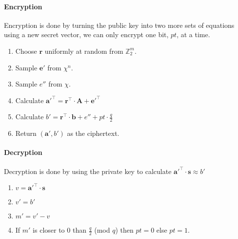 \documentclass[a4paper, 11pt, openany]{book}
\numberwithin{equation}{section}
\theoremstyle{plain}
\theoremstyle{definition}
\begin{document}
\paragraph{Encryption} Encryption is done by turning the public key into two more sets of equations using a new secret vector, we can only encrypt one bit, $pt$, at a time.
\begin{enumerate}
	\item Choose $\textbf{r}$ uniformly at random from $\mathbb{Z}^{m}_{2}$.
	\item Sample $\textbf{e}'$ from $\chi^{n}$.
	\item Sample $e''$ from $\chi$.
	\item Calculate $\textbf{a}'^{\top} = \textbf{r}^{\top}\cdot\textbf{A} + \textbf{e}'^{\top}$
	\item Calculate $b' = \textbf{r}^{\top}\cdot\textbf{b} + e'' + pt\cdot\frac{q}{2}$ 
	\item Return $(\textbf{a}',b')$ as the ciphertext.
\end{enumerate}
\paragraph{Decryption} Decryption is done by using the private key to calculate $\textbf{a}'^{\top}\cdot\textbf{s} \approx b'$
\begin{enumerate}
	\item $v = \textbf{a}'^{\top}\cdot\textbf{s}$
	\item $v' = b'$
	\item $m' = v' - v$
	\item If $m'$ is closer to 0 than $\frac{q}{2}$ (mod $q$) then $pt = 0$ else $pt = 1$.
\end{enumerate}
\end{document}
